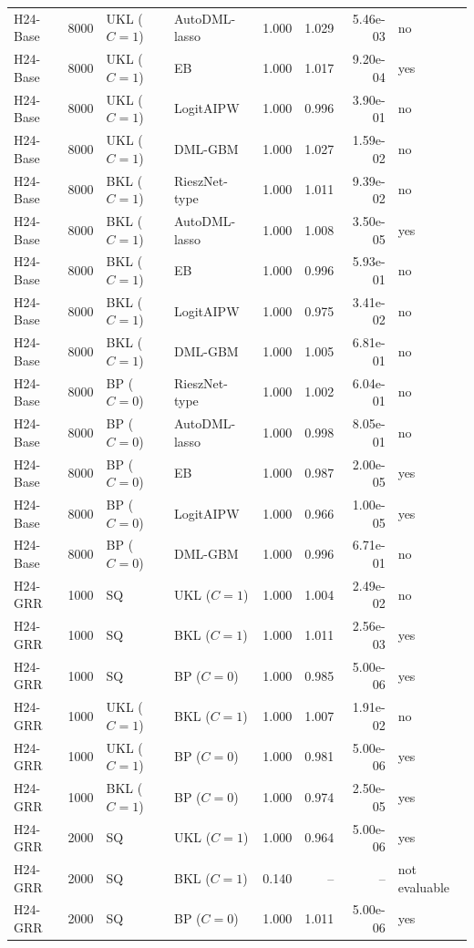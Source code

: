 \begin{tabular}{lrllrrrl}
H24-Base & 8000 & UKL ($C=1$) & AutoDML-lasso & 1.000 & 1.029 & 5.46e-03 & no \\
H24-Base & 8000 & UKL ($C=1$) & EB & 1.000 & 1.017 & 9.20e-04 & yes \\
H24-Base & 8000 & UKL ($C=1$) & LogitAIPW & 1.000 & 0.996 & 3.90e-01 & no \\
H24-Base & 8000 & UKL ($C=1$) & DML-GBM & 1.000 & 1.027 & 1.59e-02 & no \\
H24-Base & 8000 & BKL ($C=1$) & RieszNet-type & 1.000 & 1.011 & 9.39e-02 & no \\
H24-Base & 8000 & BKL ($C=1$) & AutoDML-lasso & 1.000 & 1.008 & 3.50e-05 & yes \\
H24-Base & 8000 & BKL ($C=1$) & EB & 1.000 & 0.996 & 5.93e-01 & no \\
H24-Base & 8000 & BKL ($C=1$) & LogitAIPW & 1.000 & 0.975 & 3.41e-02 & no \\
H24-Base & 8000 & BKL ($C=1$) & DML-GBM & 1.000 & 1.005 & 6.81e-01 & no \\
H24-Base & 8000 & BP ($C=0$) & RieszNet-type & 1.000 & 1.002 & 6.04e-01 & no \\
H24-Base & 8000 & BP ($C=0$) & AutoDML-lasso & 1.000 & 0.998 & 8.05e-01 & no \\
H24-Base & 8000 & BP ($C=0$) & EB & 1.000 & 0.987 & 2.00e-05 & yes \\
H24-Base & 8000 & BP ($C=0$) & LogitAIPW & 1.000 & 0.966 & 1.00e-05 & yes \\
H24-Base & 8000 & BP ($C=0$) & DML-GBM & 1.000 & 0.996 & 6.71e-01 & no \\
H24-GRR & 1000 & SQ & UKL ($C=1$) & 1.000 & 1.004 & 2.49e-02 & no \\
H24-GRR & 1000 & SQ & BKL ($C=1$) & 1.000 & 1.011 & 2.56e-03 & yes \\
H24-GRR & 1000 & SQ & BP ($C=0$) & 1.000 & 0.985 & 5.00e-06 & yes \\
H24-GRR & 1000 & UKL ($C=1$) & BKL ($C=1$) & 1.000 & 1.007 & 1.91e-02 & no \\
H24-GRR & 1000 & UKL ($C=1$) & BP ($C=0$) & 1.000 & 0.981 & 5.00e-06 & yes \\
H24-GRR & 1000 & BKL ($C=1$) & BP ($C=0$) & 1.000 & 0.974 & 2.50e-05 & yes \\
H24-GRR & 2000 & SQ & UKL ($C=1$) & 1.000 & 0.964 & 5.00e-06 & yes \\
H24-GRR & 2000 & SQ & BKL ($C=1$) & 0.140 & -- & -- & not evaluable \\
H24-GRR & 2000 & SQ & BP ($C=0$) & 1.000 & 1.011 & 5.00e-06 & yes \\

\end{tabular}
